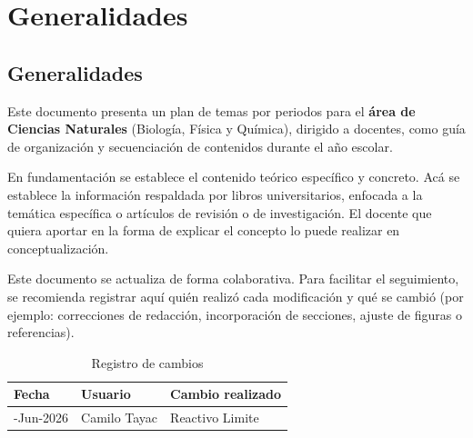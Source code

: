 \documentclass[
  spanish,
  letterpaper,
  12pt,
  oneside,
  open=any,
  DIV=15]{scrbook}
\begin{document}
\part{Generalidades}

\chapter{Generalidades}\label{generalidades-1}

Este documento presenta un plan de temas por periodos para el
\textbf{área de Ciencias Naturales} (Biología, Física y Química),
dirigido a docentes, como guía de organización y secuenciación de
contenidos durante el año escolar.

\begin{tcolorbox}[enhanced jigsaw, arc=.35mm, bottomrule=.15mm, bottomtitle=1mm, breakable, colback=white, colbacktitle=quarto-callout-important-color!10!white, colframe=quarto-callout-important-color-frame, coltitle=black, left=2mm, leftrule=.75mm, opacityback=0, opacitybacktitle=0.6, rightrule=.15mm, title=\textcolor{quarto-callout-important-color}{\faExclamation}\hspace{0.5em}{Fundamentación}, titlerule=0mm, toprule=.15mm, toptitle=1mm]

En fundamentación se establece el contenido teórico específico y
concreto. Acá se establece la información respaldada por libros
universitarios, enfocada a la temática específica o artículos de
revisión o de investigación. El docente que quiera aportar en la forma
de explicar el concepto lo puede realizar en conceptualización.

\end{tcolorbox}

Este documento se actualiza de forma colaborativa. Para facilitar el
seguimiento, se recomienda registrar aquí quién realizó cada
modificación y qué se cambió (por ejemplo: correcciones de redacción,
incorporación de secciones, ajuste de figuras o referencias).

\begingroup
{}
{

\begin{longtable}[]{@{}lll@{}}

\caption{\label{tbl-registro-cambios}Registro de cambios}

\tabularnewline

\toprule\noalign{}
\rowcolor{icfesheader}\color{icfestext}\bfseries
Fecha & Usuario & Cambio realizado \\
\midrule\noalign{}
\endhead
\bottomrule\noalign{}
\endlastfoot
\rowcolors{2}{icfeveryodd}{icfeveryeven}
\color{icfestabletext}\mdseries
8-Jun-2026 & Camilo Tayac & Reactivo Limite \\

\end{longtable}

}
\endgroup
\end{document}
